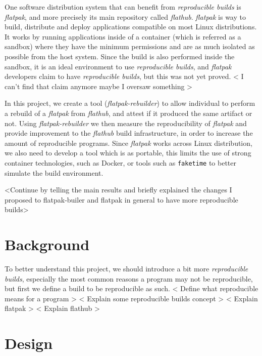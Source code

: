 \documentclass[a4paper,11pt,oneside]{report}
\newcommand{\sysname}{\emph{flatpak-rebuilder}\xspace}
\newcommand{\rb}{\emph{reproducible builds}\xspace}
\newcommand{\fp}{\emph{flatpak}\xspace}
\newcommand{\fh}{\emph{flathub}\xspace}
\begin{document}
One software distribution system that can benefit from \rb is \fp, and more
precisely its main repository called \fh. \fp is way to build, distribute and
deploy applications compatible on most Linux distributions. It works by running
applications inside of a container (which is referred as a sandbox) where they
have the minimum permissions and are as much isolated as possible from the host
system. Since the build is also performed inside the sandbox, it is an ideal
environment to use \rb, and \fp developers claim to have \rb, but this was not
yet proved.
< I can't find that claim anymore maybe I oversaw something >

In this project, we create a tool (\sysname) to allow individual to perform a
rebuild of a \fp from \fh, and attest if it produced the same artifact or not.
Using \sysname we then measure the reproducibility of \fp and provide
improvement to the \fh build infrastructure, in order to increase the amount of
reproducible programs. Since \fp works across Linux distribution, we also need
to develop a tool which is as portable, this limits the use of strong container
technologies, such as Docker, or tools such as \verb|faketime| to better
simulate the build environment.

<Continue by telling the main results and briefly explained the changes I
proposed to flatpak-builer and flatpak in general to have more reproducible builds>


\chapter{Background}

To better understand this project, we should introduce a bit more \rb,
especially the most common reasons a program may not be reproducible, but first
we define a build to be reproducible as such.
< Define what reproducible means for a program >
< Explain some reproducible builds concept >
< Explain flatpak >
< Explain flathub >

\chapter{Design}
\end{document}
